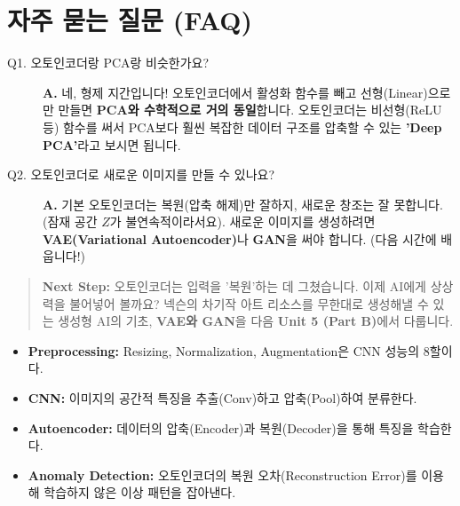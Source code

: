 \documentclass[11pt,a4paper]{book}
\theoremstyle{definition}
\begin{document}
\section{자주 묻는 질문 (FAQ)}

\begin{description}
    \item[Q1. 오토인코더랑 PCA랑 비슷한가요?]
    \textbf{A.} 네, 형제 지간입니다!
    오토인코더에서 활성화 함수를 빼고 선형(Linear)으로만 만들면 \textbf{PCA와 수학적으로 거의 동일}합니다. 오토인코더는 비선형(ReLU 등) 함수를 써서 PCA보다 훨씬 복잡한 데이터 구조를 압축할 수 있는 \textbf{'Deep PCA'}라고 보시면 됩니다.
    
    \item[Q2. 오토인코더로 새로운 이미지를 만들 수 있나요?]
    \textbf{A.} 기본 오토인코더는 복원(압축 해제)만 잘하지, 새로운 창조는 잘 못합니다. (잠재 공간 $Z$가 불연속적이라서요). 새로운 이미지를 생성하려면 \textbf{VAE(Variational Autoencoder)}나 \textbf{GAN}을 써야 합니다. (다음 시간에 배웁니다!)
\end{description}

\vspace{1cm}
\begin{quote}
\textbf{Next Step:} 오토인코더는 입력을 '복원'하는 데 그쳤습니다. 이제 AI에게 상상력을 불어넣어 볼까요? 넥슨의 차기작 아트 리소스를 무한대로 생성해낼 수 있는 생성형 AI의 기초, \textbf{VAE와 GAN}을 다음 \textbf{Unit 5 (Part B)}에서 다룹니다.
\end{quote}

\begin{summarybox}[title={Module 5 (Part A) 핵심 요약}]
\begin{itemize}
    \item \textbf{Preprocessing:} Resizing, Normalization, Augmentation은 CNN 성능의 8할이다.
    \item \textbf{CNN:} 이미지의 공간적 특징을 추출(Conv)하고 압축(Pool)하여 분류한다.
    \item \textbf{Autoencoder:} 데이터의 압축(Encoder)과 복원(Decoder)을 통해 특징을 학습한다.
    \item \textbf{Anomaly Detection:} 오토인코더의 복원 오차(Reconstruction Error)를 이용해 학습하지 않은 이상 패턴을 잡아낸다.
\end{itemize}
\end{summarybox}


\end{document}
